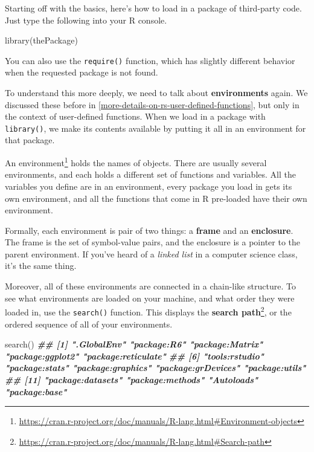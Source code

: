 \documentclass[
  12pt,
  krantz2]{krantz}
\makeatletter
\newenvironment{Shaded}{\begin{snugshade}}{\end{snugshade}}
\newcommand{\DocumentationTok}[1]{\textcolor[rgb]{0.37,0.37,0.37}{\textbf{\textit{#1}}}}
\newcommand{\FunctionTok}[1]{\textcolor[rgb]{0,0,0}{#1}}
\newcommand{\NormalTok}[1]{#1}
\renewcommand{\href}[2]{#2\footnote{\url{#1}}}
\newenvironment{kframe}{%
\medskip{}
\setlength{\fboxsep}{.8em}
 \def\at@end@of@kframe{}%
 \ifinner\ifhmode%
  \def\at@end@of@kframe{\end{minipage}}%
  \begin{minipage}{\columnwidth}%
 \fi\fi%
 \def\FrameCommand##1{\hskip\@totalleftmargin \hskip-\fboxsep
 \colorbox{shadecolor}{##1}\hskip-\fboxsep
     \hskip-\linewidth \hskip-\@totalleftmargin \hskip\columnwidth}%
 \MakeFramed {\advance\hsize-\width
   \@totalleftmargin\z@ \linewidth\hsize
   \@setminipage}}%
 {\par\unskip\endMakeFramed%
 \at@end@of@kframe}
\renewenvironment{Shaded}{\begin{kframe}}{\end{kframe}}
\makeatother
\begin{document}
Starting off with the basics, here's how to load in a package of third-party code. Just type the following into your R console.

\begin{Shaded}
\begin{Highlighting}[]
\FunctionTok{library}\NormalTok{(thePackage)}
\end{Highlighting}
\end{Shaded}

You can also use the \texttt{require()} function, which has slightly different behavior when the requested package is not found.

To understand this more deeply, we need to talk about \textbf{environments} again. We discussed these before in \ref{more-details-on-rs-user-defined-functions}, but only in the context of user-defined functions. When we load in a package with \texttt{library()}, we make its contents available by putting it all in an environment for that package.

An \href{https://cran.r-project.org/doc/manuals/R-lang.html\#Environment-objects}{environment} holds the names of objects. There are usually several environments, and each holds a different set of functions and variables. All the variables you define are in an environment, every package you load in gets its own environment, and all the functions that come in R pre-loaded have their own environment.

Formally, each environment is pair of two things: a \textbf{frame} and an \textbf{enclosure}. The frame is the set of symbol-value pairs, and the enclosure is a pointer to the parent environment. If you've heard of a \emph{linked list} in a computer science class, it's the same thing.

Moreover, all of these environments are connected in a chain-like structure. To see what environments are loaded on your machine, and what order they were loaded in, use the \texttt{search()} function. This displays the \href{https://cran.r-project.org/doc/manuals/R-lang.html\#Search-path}{\textbf{search path}}, or the ordered sequence of all of your environments.

\begin{Shaded}
\begin{Highlighting}[]
\FunctionTok{search}\NormalTok{()}
\DocumentationTok{\#\#  [1] ".GlobalEnv"         "package:R6"         "package:Matrix"     "package:ggplot2"    "package:reticulate"}
\DocumentationTok{\#\#  [6] "tools:rstudio"      "package:stats"      "package:graphics"   "package:grDevices"  "package:utils"     }
\DocumentationTok{\#\# [11] "package:datasets"   "package:methods"    "Autoloads"          "package:base"}
\end{Highlighting}
\end{Shaded}
\end{document}
